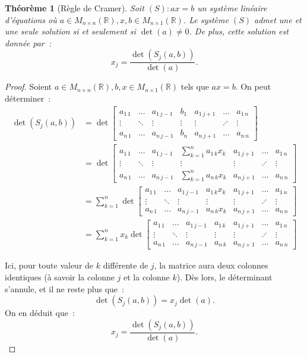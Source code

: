 \documentclass{article}
\newcommand{\R}{\mathbb R}
\newcommand{\M}[3]{M_{#1 \times #2}(#3)}
\newtheorem{thm}{Théorème}[section]
\theoremstyle{definition}
\theoremstyle{remark}
\begin{document}
		\begin{thm}[Règle de Cramer]\label{règleCramer} Soit $(S) : ax = b$ un système linéaire d'équations où $a \in \M nn\R, x, b \in \M n1\R$. Le système $(S)$
		admet une et une seule solution si et seulement si $\det(a) \neq 0$. De plus, cette solution est donnée par~:
		\[x_j = \frac {\det\left(S_j(a, b)\right)}{\det(a)}.\] \end{thm}

		\begin{proof} Soient $a \in \M nn\R, b, x \in \M n1\R$ tels que $ax = b$. On peut déterminer~:
		\[\begin{aligned}
			\det(S_j(a, b)) &= \det
				\begin{bmatrix}
					a_{1\,1} & \ldots & a_{1\,j-1} &   b_1  & a_{1\,j+1} & \ldots  & a_{1\,n} \\
					  \vdots & \ddots &   \vdots   & \vdots &   \vdots   & \iddots &   \vdots \\
					a_{n\,1} & \ldots & a_{n\,j-1} &   b_n  & a_{n\,j+1} & \ldots  & a_{n\,n}
				\end{bmatrix} \\
			&= \det
				\begin{bmatrix}
					a_{1\,1} & \ldots & a_{1\,j-1} &   \sum_{k=1}^na_{1\,k}x_k  & a_{1\,j+1} & \ldots  & a_{1\,n} \\
					  \vdots & \ddots &   \vdots   &           \vdots           &   \vdots   & \iddots &   \vdots \\
					a_{n\,1} & \ldots & a_{n\,j-1} &   \sum_{k=1}^na_{n\,k}x_k  & a_{n\,j+1} & \ldots  & a_{n\,n}
				\end{bmatrix} \\
			&= \sum_{k=1}^n
				\det
					\begin{bmatrix}
						a_{1\,1} & \ldots & a_{1\,j-1} &   a_{1\,k}x_k  & a_{1\,j+1} & \ldots  & a_{1\,n} \\
						  \vdots & \ddots &   \vdots   &     \vdots     &   \vdots   & \iddots &   \vdots \\
						a_{n\,1} & \ldots & a_{n\,j-1} &   a_{n\,k}x_k  & a_{n\,j+1} & \ldots  & a_{n\,n}
					\end{bmatrix} \\
			&= \sum_{k=1}^n
				x_k\det
					\begin{bmatrix}
						a_{1\,1} & \ldots & a_{1\,j-1} &   a_{1\,k}  & a_{1\,j+1} & \ldots  & a_{1\,n} \\
						  \vdots & \ddots &   \vdots   &   \vdots    &   \vdots   & \iddots &   \vdots \\
						a_{n\,1} & \ldots & a_{n\,j-1} &   a_{n\,k}  & a_{n\,j+1} & \ldots  & a_{n\,n}
					\end{bmatrix}
		\end{aligned}\]

		Ici, pour toute valeur de $k$ différente de $j$, la matrice aura deux colonnes identiques (à savoir la colonne $j$ et la colonne $k$). Dès lors, le déterminant
		s'annule, et il ne reste plus que~: \[\det(S_j(a, b)) = x_j\det(a).\] On en déduit que~: \[x_j = \frac {\det(S_j(a, b))}{\det(a)}.\] \end{proof}
\end{document}
